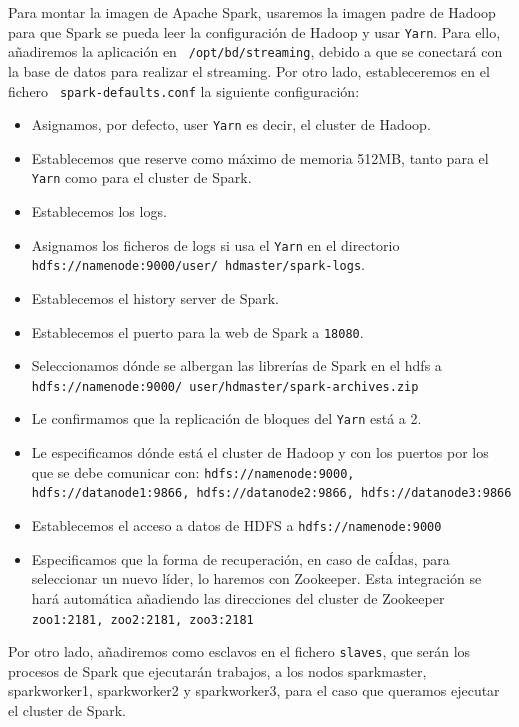 Para montar la imagen de Apache Spark, usaremos la imagen padre de Hadoop 
para que Spark se pueda leer la configuración de Hadoop y usar {\tt Yarn}.
Para ello, añadiremos la aplicación en {\tt
  /opt/bd/streaming}, debido a que se conectará con la base de datos para
realizar el streaming. Por otro lado, estableceremos en el fichero {\tt
  spark-defaults.conf} la siguiente configuración:
\begin{itemize}
\item Asignamos, por defecto, user {\tt Yarn} es decir, el cluster de
  Hadoop.
\item Establecemos que reserve como máximo de memoria 512MB, tanto para el
  {\tt Yarn} como para el cluster de Spark.
\item Establecemos los logs.
\item Asignamos los ficheros de logs si usa el {\tt Yarn} en el directorio {\tt
    hdfs://namenode:9000/user/ hdmaster/spark-logs}.
\item Establecemos el history server de Spark.
\item Establecemos el puerto para la web de Spark a {\tt 18080}.
\item Seleccionamos dónde se albergan las librerías de Spark en el hdfs a
  {\tt hdfs://namenode:9000/ user/hdmaster/spark-archives.zip}
\item Le confirmamos que la replicación de bloques del {\tt Yarn} está a 2.
\item Le especificamos dónde está el cluster de Hadoop y con los puertos
  por los que se debe comunicar con: {\tt hdfs://namenode:9000,
    hdfs://datanode1:9866, hdfs://datanode2:9866, hdfs://datanode3:9866}
\item Establecemos el acceso a datos de HDFS a {\tt hdfs://namenode:9000}
\item Especificamos que la forma de recuperación, en caso de caÍdas, para
  seleccionar un nuevo líder, lo haremos con Zookeeper. Esta integración se
  hará automática añadiendo las direcciones del cluster de Zookeeper {\tt
    zoo1:2181, zoo2:2181, zoo3:2181}
\end{itemize}

Por otro lado, añadiremos como esclavos en el fichero {\tt slaves}, que
serán los procesos de Spark que ejecutarán trabajos, a los nodos
sparkmaster, sparkworker1, sparkworker2 y sparkworker3, para el caso que
queramos ejecutar el cluster de Spark.

